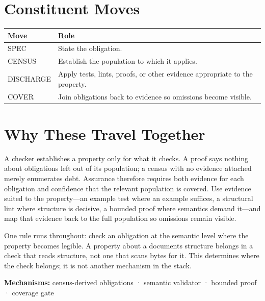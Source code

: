 \section{Constituent Moves}\label{heading:constituent-moves}

{\footnotesize
{\def\LTcaptype{none} %
\begin{longtable}[]{@{}
  >{\raggedright\arraybackslash}p{}
  >{\raggedright\arraybackslash}p{}@{}}
\toprule\noalign{}
\begin{minipage}[b]{\linewidth}\raggedright
Move
\end{minipage} & \begin{minipage}[b]{\linewidth}\raggedright
Role
\end{minipage} \\
\midrule\noalign{}
\endhead
\bottomrule\noalign{}
\endlastfoot
SPEC & State the obligation. \\
CENSUS & Establish the population to which it applies. \\
DISCHARGE & Apply tests, lints, proofs, or other evidence appropriate to the property. \\
COVER & Join obligations back to evidence so omissions become visible. \\
\end{longtable}
}
}

\section{Why These Travel Together}\label{heading:why-these-travel-together}

A checker establishes a property only for what it checks. A proof says nothing about obligations left out of its population; a census with no evidence attached merely enumerates debt. Assurance therefore requires both evidence for each obligation and confidence that the relevant population is covered. Use evidence suited to the property---an example test where an example suffices, a structural lint where structure is decisive, a bounded proof where semantics demand it---and map that evidence back to the full population so omissions remain visible.

One rule runs throughout: check an obligation at the semantic level where the property becomes legible. A property about a document\textquotesingle s structure belongs in a check that reads structure, not one that scans bytes for it. This determines where the check belongs; it is not another mechanism in the stack.

\textbf{Mechanisms:} census-derived obligations · semantic validator · bounded proof · coverage gate
